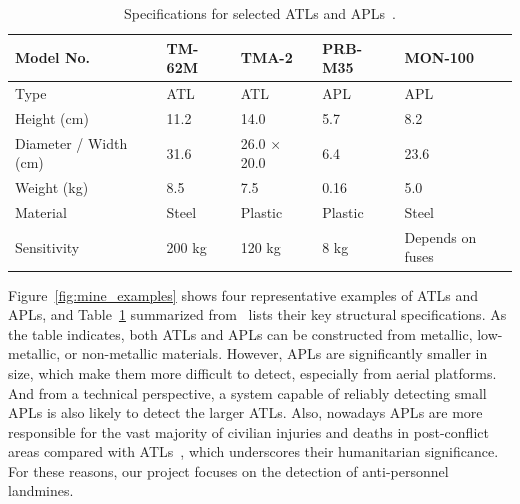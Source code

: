 \begin{table}[h]
    \centering
    \small
    \renewcommand{\arraystretch}{1.3}
    \caption{Specifications for selected \gls{ATL}s and \gls{APL}s~\cite{paik2002image}.}
    \label{tab:mine_specs}
    \begin{tabular}{l p{2.8cm} p{2.8cm} p{2.8cm} p{2.8cm}}
        \toprule
        \textbf{Model No.} & \textbf{TM-62M} & \textbf{TMA-2} & \textbf{PRB-M35} & \textbf{MON-100} \\
        \midrule
        Type & \gls{ATL} & \gls{ATL} & \gls{APL} & \gls{APL} \\
        Height (cm) & 11.2 & 14.0 & 5.7 & 8.2 \\
        Diameter / Width (cm) & 31.6 & 26.0 × 20.0 & 6.4 & 23.6 \\
        Weight (kg) & 8.5 & 7.5 & 0.16 & 5.0 \\
        Material & Steel & Plastic & Plastic & Steel \\
        Sensitivity & 200 kg & 120 kg & 8 kg & Depends on fuses \\
        \bottomrule
    \end{tabular}
\end{table}

Figure~\ref{fig:mine_examples} shows four representative examples of \gls{ATL}s and \gls{APL}s, and Table~\ref{tab:mine_specs} summarized from~\cite{paik2002image} lists their key structural specifications. As the table indicates, both \gls{ATL}s and \gls{APL}s can be constructed from metallic, low-metallic, or non-metallic materials. However, \gls{APL}s are significantly smaller in size, which make them more difficult to detect, especially from aerial platforms. And from a technical perspective, a system capable of reliably detecting small \gls{APL}s is also likely to detect the larger \gls{ATL}s. Also, nowadays \gls{APL}s are more responsible for the vast majority of civilian injuries and deaths in post-conflict areas compared with \gls{ATL}s~\cite{unmas2021handbook}, which underscores their humanitarian significance. For these reasons, our project focuses on the detection of anti-personnel landmines.
